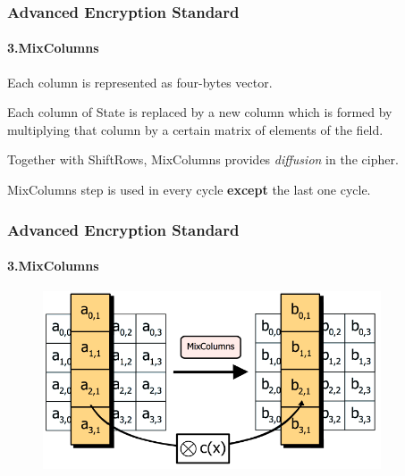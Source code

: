 \begin{frame}
	\frametitle{Advanced Encryption Standard}
		\framesubtitle{3.MixColumns}
		\vfill
	
	\begin{block}{}
    	{Each column is represented as four-bytes vector.}\\
    \end{block}
    \begin{block}{}
		{Each column of State is replaced by a new column which is formed by multiplying that column by a certain 			matrix of elements of the field.}\\	
	\end{block}	
	    \begin{block}{}
		{Together with ShiftRows, MixColumns provides \textit{diffusion} in the cipher.}\\	
	\end{block}
		\begin{alertblock}{}
		{MixColumns step is used in every cycle \textbf{except} the last one cycle.}\\
		\end{alertblock}
\end{frame}

\begin{frame}
	\frametitle{Advanced Encryption Standard}
		\framesubtitle{3.MixColumns }
		\vfill
		\begin{figure}
		\centering
		\includegraphics[width=10cm]{mixcolumn}
		\label{fig:obrazek mixcolumn}
	\end{figure}
\end{frame}


